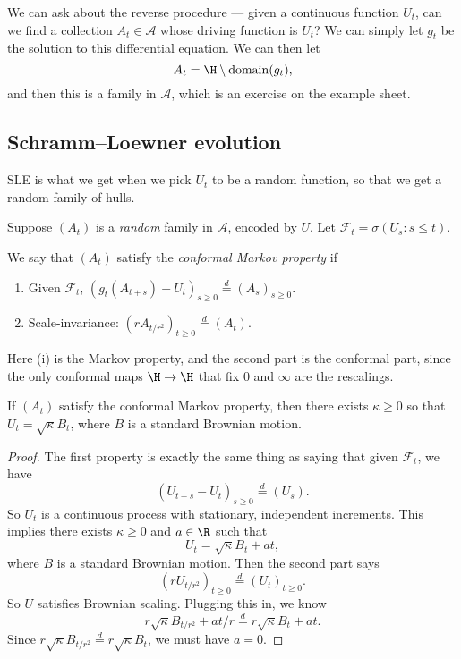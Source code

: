 \documentclass[a4paper]{article}
\begin{document}
We can ask about the reverse procedure --- given a continuous function $U_t$, can we find a collection $A_t \in \mathcal{A}$ whose driving function is $U_t$? We can simply let $g_t$ be the solution to this differential equation. We can then let
\[
  A_t = \H \setminus \mathrm{domain}(g_t),
\]
and then this is a family in $\mathcal{A}$, which is an exercise on the example sheet.

\subsection{Schramm--Loewner evolution}
SLE is what we get when we pick $U_t$ to be a random function, so that we get a random family of hulls.

Suppose $(A_t)$ is a \emph{random} family in $\mathcal{A}$, encoded by $U$. Let $\mathcal{F}_t = \sigma(U_s: s \leq t)$.
\begin{defi}
  We say that $(A_t)$ satisfy the \emph{conformal Markov property} if
  \begin{enumerate}
    \item Given $\mathcal{F}_t$, $(g_t(A_{t + s}) - U_t)_{s \geq 0} \overset{d}{=} (A_s)_{s \geq 0}$.
    \item Scale-invariance: $(r A_{t/r^2} )_{t \geq 0} \overset{d}{=} (A_t)$.
  \end{enumerate}
\end{defi}
Here (i) is the Markov property, and the second part is the conformal part, since the only conformal maps $\H \to \H$ that fix $0$ and $\infty$ are the rescalings.

\begin{thm}[Schramm]
  If $(A_t)$ satisfy the conformal Markov property, then there exists $\kappa \geq 0$ so that $U_t = \sqrt{\kappa} B_t$, where $B$ is a standard Brownian motion.
\end{thm}

\begin{proof}
  The first property is exactly the same thing as saying that given $\mathcal{F}_t$, we have
  \[
    (U_{t + s} - U_t)_{s \geq 0} \overset{d}{=} (U_s).
  \]
  So $U_t$ is a continuous process with stationary, independent increments. This implies there exists $\kappa \geq 0$ and $a \in \R$ such that
  \[
    U_t = \sqrt{\kappa}B_t + at,
  \]
  where $B$ is a standard Brownian motion. Then the second part says
  \[
    (r U_{t/r^2})_{t \geq 0} \overset{d}{=} (U_t)_{t \geq 0}.
  \]
  So $U$ satisfies Brownian scaling. Plugging this in, we know
  \[
    r \sqrt{\kappa} B_{t/r^2} + at/r \overset{d}{=} r \sqrt{\kappa} B_t + at.
  \]
  Since $r \sqrt{\kappa} B_{t/r^2} \overset{d}{=} r \sqrt{\kappa} B_t$, we must have $a = 0$.
\end{proof}
\end{document}
